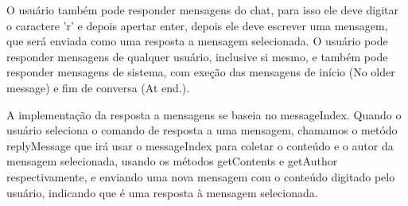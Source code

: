 \documentclass[../main.tex]{subfiles}
\begin{document}
O usuário também pode responder mensagens do chat, para isso ele deve digitar o caractere 'r' e depois apertar enter, depois ele deve escrever uma mensagem, que será enviada como uma resposta a mensagem selecionada. O usuário pode responder mensagens de qualquer usuário, inclusive si mesmo, e também pode responder mensagens de sistema, com exeção das mensagens de início (No older message) e fim de conversa (At end.).

A implementação da resposta a mensagens se baseia no messageIndex. Quando o usuário seleciona o comando de resposta a uma mensagem, chamamos o metódo replyMessage que irá usar o messageIndex para coletar o conteúdo e o autor da mensagem selecionada, usando os métodos getContents e getAuthor respectivamente, e enviando uma nova mensagem com o conteúdo digitado pelo usuário, indicando que é uma resposta à mensagem selecionada.
\end{document}
